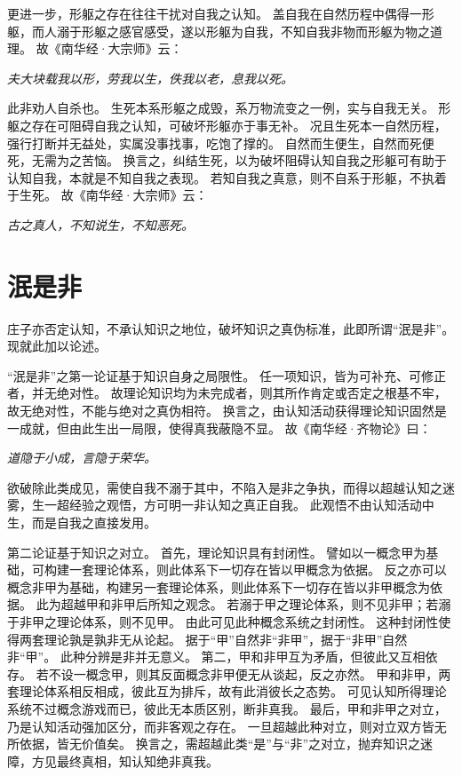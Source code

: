 \documentclass[11pt]{article}
\begin{document}
\par

更进一步，形躯之存在往往干扰对自我之认知。
盖自我在自然历程中偶得一形躯，而人溺于形躯之感官感受，遂以形躯为自我，不知自我非物而形躯为物之道理。
故《南华经·大宗师》云：

\textit{夫大块载我以形，劳我以生，佚我以老，息我以死。}

此非劝人自杀也。
生死本系形躯之成毁，系万物流变之一例，实与自我无关。
形躯之存在可阻碍自我之认知，可破坏形躯亦于事无补。
况且生死本一自然历程，强行打断并无益处，实属没事找事，吃饱了撑的。
自然而生便生，自然而死便死，无需为之苦恼。
换言之，纠结生死，以为破坏阻碍认知自我之形躯可有助于认知自我，本就是不知自我之表现。
若知自我之真意，则不自系于形躯，不执着于生死。
故《南华经·大宗师》云：

\textit{古之真人，不知说生，不知恶死。}

\section{泯是非}
庄子亦否定认知，不承认知识之地位，破坏知识之真伪标准，此即所谓“泯是非”。
现就此加以论述。

\newline

“泯是非”之第一论证基于知识自身之局限性。
任一项知识，皆为可补充、可修正者，并无绝对性。
故理论知识均为未完成者，则其所作肯定或否定之根基不牢，故无绝对性，不能与绝对之真伪相符。
换言之，由认知活动获得理论知识固然是一成就，但由此生出一局限，使得真我蔽隐不显。
故《南华经·齐物论》曰：

\textit{道隐于小成，言隐于荣华。}

欲破除此类成见，需使自我不溺于其中，不陷入是非之争执，而得以超越认知之迷雾，生一超经验之观悟，方可明一非认知之真正自我。
此观悟不由认知活动中生，而是自我之直接发用。


\newline

第二论证基于知识之对立。
首先，理论知识具有封闭性。
譬如以一概念甲为基础，可构建一套理论体系，则此体系下一切存在皆以甲概念为依据。
反之亦可以概念非甲为基础，构建另一套理论体系，则此体系下一切存在皆以非甲概念为依据。
此为超越甲和非甲后所知之观念。
若溺于甲之理论体系，则不见非甲；若溺于非甲之理论体系，则不见甲。
由此可见此种概念系统之封闭性。
这种封闭性使得两套理论孰是孰非无从论起。
据于“甲”自然非“非甲”，据于“非甲”自然非“甲”。
此种分辨是非并无意义。
第二，甲和非甲互为矛盾，但彼此又互相依存。
若不设一概念甲，则其反面概念非甲便无从谈起，反之亦然。
甲和非甲，两套理论体系相反相成，彼此互为排斥，故有此消彼长之态势。
可见认知所得理论系统不过概念游戏而已，彼此无本质区别，断非真我。
最后，甲和非甲之对立，乃是认知活动强加区分，而非客观之存在。
一旦超越此种对立，则对立双方皆无所依据，皆无价值矣。
换言之，需超越此类“是”与“非”之对立，抛弃知识之迷障，方见最终真相，知认知绝非真我。
\end{document}
